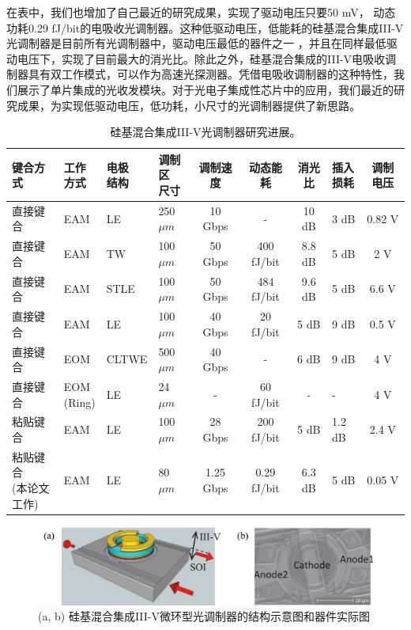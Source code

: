 在表中，我们也增加了自己最近的研究成果，实现了驱动电压只要50 mV， 动态功耗0.29 fJ/bit的电吸收光调制器。这种低驱动电压，低能耗的硅基混合集成III-V光调制器是目前所有光调制器中，驱动电压最低的器件之一 ，并且在同样最低驱动电压下，实现了目前最大的消光比。除此之外，硅基混合集成的III-V电吸收调制器具有双工作模式，可以作为高速光探测器。凭借电吸收调制器的这种特性，我们展示了单片集成的光收发模块\cite{chen2016wavelength}。对于光电子集成性芯片中的应用，我们最近的研究成果，为实现低驱动电压，低功耗，小尺寸的光调制器提供了新思路。
{
	\begin{table}[htb]
		\caption{硅基混合集成III-V光调制器研究进展。}
		\label{sil_IIIV_mod}
		\centering
		\begin{tabular}[t]{p{2cm}p{1cm}p{1cm}p{1.2cm}cccp{1cm}c}
			\hline
			键合方式  & \tabincell{c}{工作 \\ 方式} &\tabincell{c}{电极 \\ 结构}  & \tabincell{c}{调制区 \\ 尺寸} & 调制速度 & 动态能耗 & 消光比 & \tabincell{c}{插入 \\ 损耗} & 调制电压\\
			\hline
			直接键合\cite{kuo2008high} & EAM & LE & 250 $\mu m$ & 10 Gbps & - & 10 dB & 3 dB & 0.82 V\\
			直接键合\cite{tang201150} & EAM & TW & 100 $\mu m$ & 50 Gbps & 400 fJ/bit & 8.8 dB & 5 dB & 2 V\\
			直接键合\cite{tang2012over} & EAM & STLE & 100 $\mu m$ & 50 Gbps & 484 fJ/bit & 9.6 dB & 5 dB & 6.6 V\\
			直接键合\cite{tang2012energy} & EAM & LE & 100 $\mu m$ & 40 Gbps & 20 fJ/bit & 5 dB & 9 dB & 0.5 V\\
			直接键合\cite{chen2011forty} & EOM & CLTWE & 500 $\mu m$ & 40 Gbps & - & 6 dB & 9 dB & 4 V\\
			直接键合\cite{Srinivasan2012micro} & \tabincell{c}{EOM\\(Ring)} & LE & 24 $\mu m$ & - & 60 fJ/bit & - & - & 4 V\\
			粘贴键合\cite{fu20155} & EAM & LE  & 100 $\mu m$ & 28 Gbps & 200 fJ/bit & 5 dB & 1.2 dB & 2.4 V\\
			\tabincell{c}{粘贴键合 \\ (本论文工作)} & EAM & LE  & 80 $\mu m$ & 1.25 Gbps & 0.29 fJ/bit & 6.3 dB & 5 dB & 0.05 V\\
			\hline
		\end{tabular}
	\end{table}
}

\begin{figure}[htb]
	\centering
	\includegraphics[width=12cm]{./Pictures/fig_eam_ring.jpg}
	\caption{ (a, b) 硅基混合集成III-V微环型光调制器的结构示意图和器件实际图\cite{Srinivasan2012micro}}
	\label{fig_eam_ring}
\end{figure}

